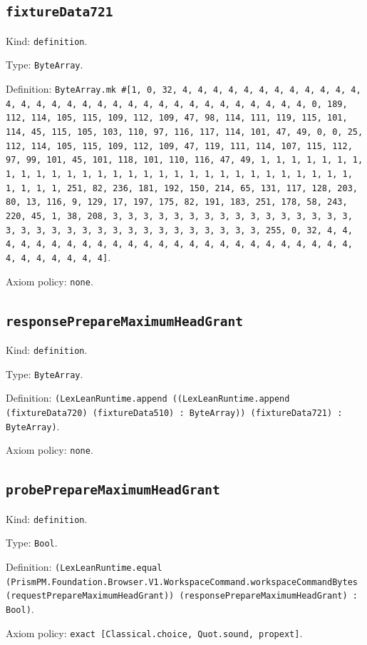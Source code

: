 \documentclass[11pt]{article}
\begin{document}
\subsection*{\texttt{fixtureData721}}
\noindent Kind: \texttt{definition}.\par
\noindent Type: \texttt{ByteArray}.\par
\noindent Definition: \texttt{ByteArray.mk \#[1, 0, 32, 4, 4, 4, 4, 4, 4, 4, 4, 4, 4, 4, 4, 4, 4, 4, 4, 4, 4, 4, 4, 4, 4, 4, 4, 4, 4, 4, 4, 4, 4, 4, 4, 0, 189, 112, 114, 105, 115, 109, 112, 109, 47, 98, 114, 111, 119, 115, 101, 114, 45, 115, 105, 103, 110, 97, 116, 117, 114, 101, 47, 49, 0, 0, 25, 112, 114, 105, 115, 109, 112, 109, 47, 119, 111, 114, 107, 115, 112, 97, 99, 101, 45, 101, 118, 101, 110, 116, 47, 49, 1, 1, 1, 1, 1, 1, 1, 1, 1, 1, 1, 1, 1, 1, 1, 1, 1, 1, 1, 1, 1, 1, 1, 1, 1, 1, 1, 1, 1, 1, 1, 1, 1, 1, 251, 82, 236, 181, 192, 150, 214, 65, 131, 117, 128, 203, 80, 13, 116, 9, 129, 17, 197, 175, 82, 191, 183, 251, 178, 58, 243, 220, 45, 1, 38, 208, 3, 3, 3, 3, 3, 3, 3, 3, 3, 3, 3, 3, 3, 3, 3, 3, 3, 3, 3, 3, 3, 3, 3, 3, 3, 3, 3, 3, 3, 3, 3, 3, 3, 255, 0, 32, 4, 4, 4, 4, 4, 4, 4, 4, 4, 4, 4, 4, 4, 4, 4, 4, 4, 4, 4, 4, 4, 4, 4, 4, 4, 4, 4, 4, 4, 4, 4, 4]}.\par
\noindent Axiom policy: \texttt{none}.\par
\subsection*{\texttt{responsePrepareMaximumHeadGrant}}
\noindent Kind: \texttt{definition}.\par
\noindent Type: \texttt{ByteArray}.\par
\noindent Definition: \texttt{(LexLeanRuntime.append ((LexLeanRuntime.append (fixtureData720) (fixtureData510) : ByteArray)) (fixtureData721) : ByteArray)}.\par
\noindent Axiom policy: \texttt{none}.\par
\subsection*{\texttt{probePrepareMaximumHeadGrant}}
\noindent Kind: \texttt{definition}.\par
\noindent Type: \texttt{Bool}.\par
\noindent Definition: \texttt{(LexLeanRuntime.equal (PrismPM.Foundation.Browser.V1.WorkspaceCommand.workspaceCommandBytes (requestPrepareMaximumHeadGrant)) (responsePrepareMaximumHeadGrant) : Bool)}.\par
\noindent Axiom policy: \texttt{exact [Classical.choice, Quot.sound, propext]}.\par
\end{document}
